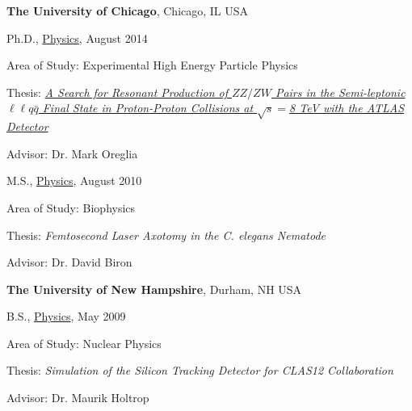 \documentclass[10pt]{article}
\newenvironment{outerlist}[1][\enskip\textbullet]%
        {\begin{itemize}[#1]}{\end{itemize}%
         \vspace{-.6\baselineskip}}
\newenvironment{innerlist}[1][\enskip\textbullet]%
        {\begin{compactitem}[#1]}{\end{compactitem}}
\begin{document}
{\textbf{The University of Chicago}},
Chicago, IL USA

\begin{outerlist}
\item[] Ph.D.,
        \href{http://physics.uchicago.edu/}
             {Physics}, August 2014
        \begin{innerlist}
        \item Area of Study: Experimental High Energy Particle Physics
        \item Thesis: \emph{\href{https://cds.cern.ch/record/1745988?ln=en}{A Search for Resonant Production of $ZZ/ZW$ Pairs in the Semi-leptonic $\ell\ell q\bar{q}$ Final State in Proton-Proton Collisions at $\sqrt{s}=$8 TeV with the ATLAS Detector}}
        \item Advisor: Dr. Mark Oreglia
        \end{innerlist}

\item[] M.S.,
        \href{http://physics.uchicago.edu/}
             {Physics}, August 2010
        \begin{innerlist}
        \item Area of Study: Biophysics
        \item Thesis: \emph{Femtosecond Laser Axotomy in the C. elegans Nematode}
        \item Advisor: Dr. David Biron
        \end{innerlist}
\end{outerlist}
\vspace{3 mm}
{\textbf{The University of New Hampshire}},
Durham, NH USA

\begin{outerlist}
\item[] B.S.,
        \href{http://www.physics.unh.edu/}
             {Physics}, May 2009
        \begin{innerlist}
        \item Area of Study: Nuclear Physics
        \item Thesis: \emph{Simulation of the Silicon Tracking Detector for CLAS12 Collaboration}
        \item Advisor: Dr. Maurik Holtrop
        \end{innerlist}
\end{outerlist}
\end{document}
